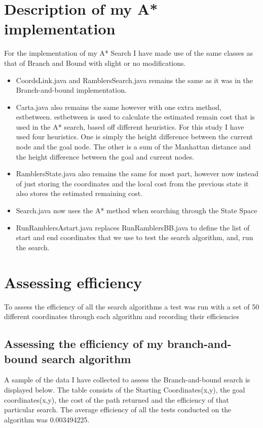\documentclass[11pt,oneside]{article}
\begin{document}
\section{Description of my A* implementation}
For the implementation of my A* Search I have made use of the same classes as that of Branch and Bound with slight or no modifications. 

\begin{itemize}
    \item CoordsLink.java and RamblersSearch.java remains the same as it was in the Branch-and-bound implementation.
    \item Carta.java also remains the same however with one extra method, estbetween. estbetween is used to calculate the estimated remain cost that is used in the A* search, based off different heuristics. For this study I have used four heuristics. One is simply the height difference between the current node and the goal node. The other is a sum of the Manhattan distance and the height difference between the goal and current nodes.
    
    \item RamblersState.java also remains the same for most part, however now instead of just storing the coordinates and the local cost from the previous state it also stores the estimated remaining cost.
    \item Search.java now uses the A* method when searching through the State Space
    \item RunRamblersAstart.java replaces RunRamblersBB.java to define the list of start and end coordinates that we use to test the search algorithm, and, run the search.
\end{itemize}
 
\section{Assessing efficiency}
To assess the efficiency of all the search algorithms a test was run with a set of 50 different coordinates through each algorithm and recording their efficiencies

\subsection{Assessing the efficiency of my branch-and-bound search algorithm}
A sample of the data I have collected to assess the Branch-and-bound search is displayed below. The table consists of the Starting Coordinates(x,y), the goal coordinates(x,y), the cost of the path returned and the efficiency of that particular search. The average efficiency of all the tests conducted on the algorithm was 0.003494225.
\end{document}

